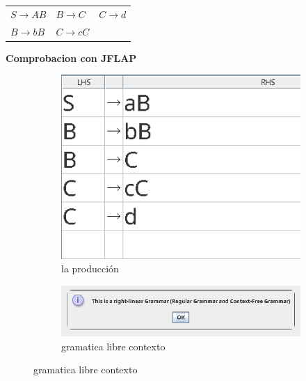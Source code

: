 \documentclass{article}
\begin{document}
        \begin{tabularx}{\textwidth}{XXX}
            $S \rightarrow AB$ & $B \rightarrow C$ & $C \rightarrow d$\\
            $B \rightarrow bB$ & $C \rightarrow cC$\\
        \end{tabularx}

        \vspace{\baselineskip} %
        \textbf{Comprobacion con JFLAP}
            \begin{figure}[!h] 
            \centering
                \centering
                \begin{subfigure}[b]{0.35\textwidth}
                    \centering
                    \includegraphics[width=\textwidth]{./Imagenes/image8.png}
                    \caption{la producción}
                    \label{fig:label1}
                \end{subfigure}
                \hfill
                \begin{subfigure}[b]{0.55\textwidth}
                    \centering
                    \includegraphics[width=\textwidth]{./Imagenes/image5.png}
                    \caption{gramatica libre contexto}
                    \label{fig:label2}
                \end{subfigure}

\end{figure}
\end{document}
